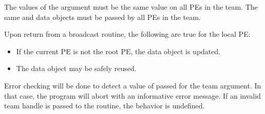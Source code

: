 \begin{apidefinition}
{    The values of the argument  must be the same value on all \acp{PE} in
    the team. The same \dest{} and \source{} data objects must be passed by all \acp{PE}
    in the team.

    Upon return from a broadcast routine, the following are true for the local \ac{PE}:
    \begin{itemize}
    \item If the current \ac{PE} is not the root \ac{PE},
      the \dest{} data object is updated.
    \item The \source{} data object may be safely reused.
    \end{itemize}

    Error checking will be done to detect a value of  passed
    for the team argument. In that case, the program will abort with an informative
    error message. If an invalid team handle is passed to the routine,
    the behavior is undefined.
}




\apinotes{
}

\end{apidefinition}
